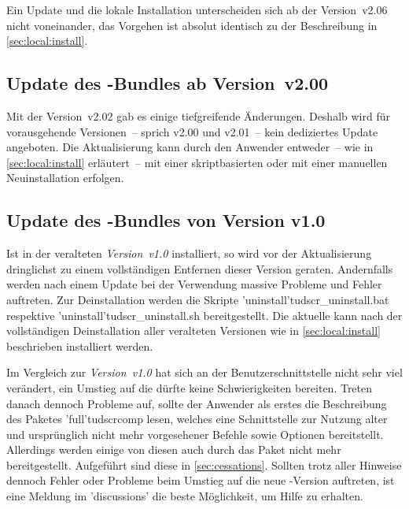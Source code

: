 Ein Update und die lokale Installation unterscheiden sich ab der Version~v2.06 
nicht voneinander, das Vorgehen ist absolut identisch zu der Beschreibung in 
\autoref{sec:local:install}.



\subsection{Update des \TUDScript-Bundles ab Version~v2.00}

Mit der Version~v2.02 gab es einige tiefgreifende Änderungen. Deshalb wird für 
vorausgehende Versionen~-- sprich v2.00 und v2.01~-- kein dediziertes Update 
angeboten. Die Aktualisierung kann durch den Anwender entweder~-- wie in 
\autoref{sec:local:install} erläutert~-- mit einer skriptbasierten oder mit 
einer manuellen Neuinstallation erfolgen.%
%



\subsection{Update des \TUDScript-Bundles von Version v1.0}

Ist \TUDScript in der veralteten \emph{Version~v1.0} installiert, so wird vor 
der Aktualisierung dringlichst zu einem vollständigen Entfernen dieser Version 
geraten. Andernfalls werden nach einem Update bei der Verwendung massive 
Probleme und Fehler auftreten. Zur Deinstallation werden die Skripte 
\GitHubFile*'uninstall'{tudscr_uninstall.bat} respektive
\GitHubFile*'uninstall'{tudscr_uninstall.sh} bereitgestellt. Die aktuelle 
 kann nach der vollständigen Deinstallation aller 
veralteten Versionen wie in \autoref{sec:local:install} beschrieben installiert 
werden.

Im Vergleich zur \emph{Version~v1.0} hat sich an der Benutzerschnittstelle 
nicht sehr viel verändert, ein Umstieg auf die  dürfte 
keine Schwierigkeiten bereiten. Treten danach dennoch Probleme auf, sollte der 
Anwender als erstes die Beschreibung des Paketes \Package'full'{tudscrcomp} 
lesen, welches eine Schnittstelle zur Nutzung alter und ursprünglich nicht mehr 
vorgesehener Befehle sowie Optionen bereitstellt. Allerdings werden einige von 
diesen auch durch das Paket  nicht mehr bereitgestellt. 
Aufgeführt sind diese in \autoref{sec:cessations}. Sollten trotz aller Hinweise 
dennoch Fehler oder Probleme beim Umstieg auf die neue \TUDScript-Version 
auftreten, ist eine Meldung im \GitHubRepo'discussions' die beste Möglichkeit, 
um Hilfe zu erhalten.



